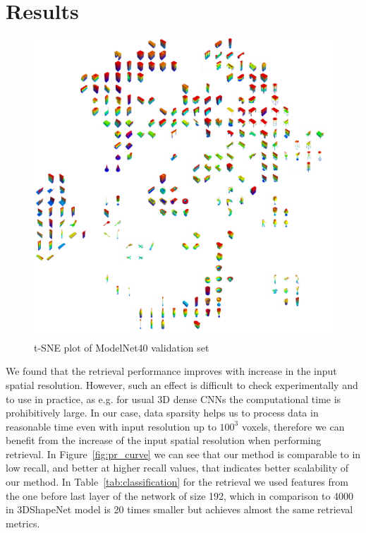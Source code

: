 \section{Results}
\label{sec:5}

\begin{figure}
  \centering
    \includegraphics[width=\textwidth]{Figures/shape_retrieval/cnn_embed_2k.jpg}
    \caption{t-SNE plot of ModelNet40 validation set}
    \label{fig:modelnet_tsne}
\end{figure}

We found that the retrieval performance improves with increase in the input spatial resolution. However, such an effect is difficult to check experimentally and to use in practice, as e.g. for usual 3D dense CNNs the computational time is prohibitively large. In our case, data sparsity helps us to process data in reasonable time even with input resolution up to $100^3$ voxels, therefore we can benefit from the increase of the input spatial resolution when performing retrieval.
In Figure~\ref{fig:pr_curve} we can see that our method is comparable to \cite{wu20153d} in low recall, and better at higher recall values, that indicates better scalability of our method.
In Table~\ref{tab:classification} for the retrieval we used features from the one before last layer of the network of size 192, which in  comparison to 4000 in 3DShapeNet model \cite{wu20153d} is 20 times smaller but achieves almost the same retrieval metrics.


